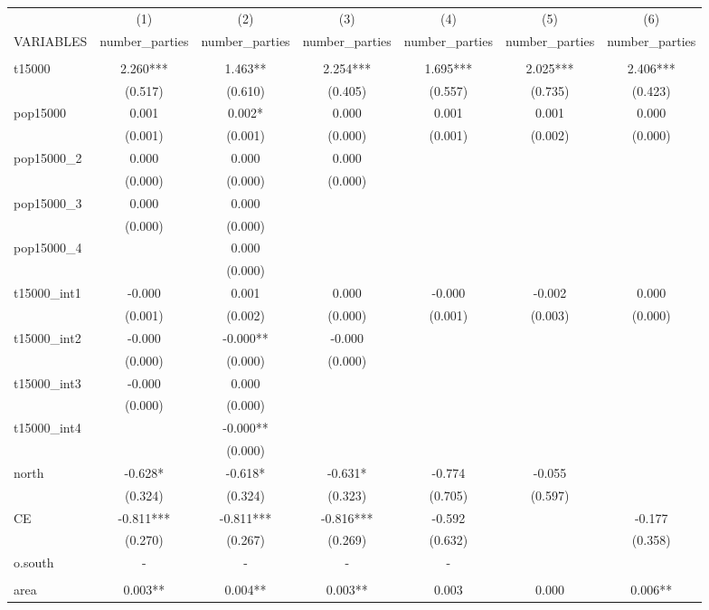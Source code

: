 \documentclass[]{article}
\begin{document}
\begin{tabular}{lcccccc} \hline
 & (1) & (2) & (3) & (4) & (5) & (6) \\
VARIABLES & number\_parties & number\_parties & number\_parties & number\_parties & number\_parties & number\_parties \\ \hline
 &  &  &  &  &  &  \\
t15000 & 2.260*** & 1.463** & 2.254*** & 1.695*** & 2.025*** & 2.406*** \\
 & (0.517) & (0.610) & (0.405) & (0.557) & (0.735) & (0.423) \\
pop15000 & 0.001 & 0.002* & 0.000 & 0.001 & 0.001 & 0.000 \\
 & (0.001) & (0.001) & (0.000) & (0.001) & (0.002) & (0.000) \\
pop15000\_2 & 0.000 & 0.000 & 0.000 &  &  &  \\
 & (0.000) & (0.000) & (0.000) &  &  &  \\
pop15000\_3 & 0.000 & 0.000 &  &  &  &  \\
 & (0.000) & (0.000) &  &  &  &  \\
pop15000\_4 &  & 0.000 &  &  &  &  \\
 &  & (0.000) &  &  &  &  \\
t15000\_int1 & -0.000 & 0.001 & 0.000 & -0.000 & -0.002 & 0.000 \\
 & (0.001) & (0.002) & (0.000) & (0.001) & (0.003) & (0.000) \\
t15000\_int2 & -0.000 & -0.000** & -0.000 &  &  &  \\
 & (0.000) & (0.000) & (0.000) &  &  &  \\
t15000\_int3 & -0.000 & 0.000 &  &  &  &  \\
 & (0.000) & (0.000) &  &  &  &  \\
t15000\_int4 &  & -0.000** &  &  &  &  \\
 &  & (0.000) &  &  &  &  \\
north & -0.628* & -0.618* & -0.631* & -0.774 & -0.055 &  \\
 & (0.324) & (0.324) & (0.323) & (0.705) & (0.597) &  \\
CE & -0.811*** & -0.811*** & -0.816*** & -0.592 &  & -0.177 \\
 & (0.270) & (0.267) & (0.269) & (0.632) &  & (0.358) \\
o.south & - & - & - & - &  &  \\
 &  &  &  &  &  &  \\
area & 0.003** & 0.004** & 0.003** & 0.003 & 0.000 & 0.006** \\

\end{tabular}
\end{document}
